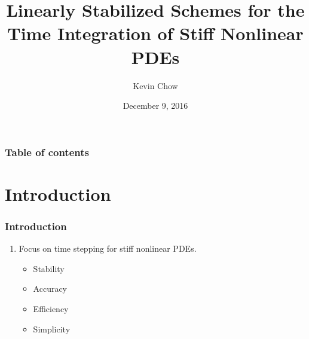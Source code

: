 \documentclass[hyperref={pdfpagelabels=false}]{beamer}
\title[Linearly Stabilized Schemes]{Linearly Stabilized Schemes for the Time Integration of Stiff Nonlinear PDEs}
\author[Kevin Chow]{Kevin Chow}
\date{December 9, 2016}
\begin{document}
\begin{frame}
\titlepage
\end{frame} 


\begin{frame}
\frametitle{Table of contents}
\tableofcontents
\end{frame} 


\section{Introduction} 
\begin{frame}
\frametitle{Introduction}
\begin{enumerate}
	\item Focus on time stepping for stiff nonlinear PDEs.
	\begin{itemize}
		\item Stability
		\item Accuracy
		\item Efficiency
		\item Simplicity
	\end{itemize}
\end{enumerate}
\end{frame}
\end{document}
